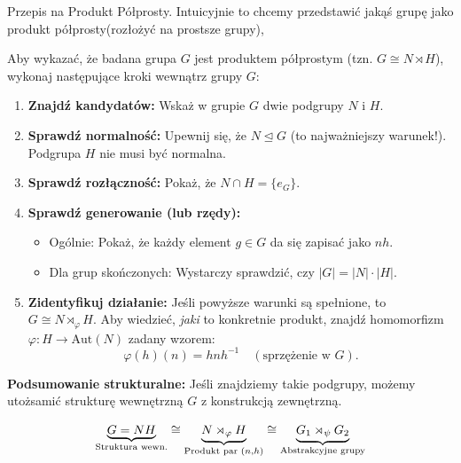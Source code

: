 \begin{context}
	Przepis na Produkt Półprosty. Intuicyjnie to chcemy przedstawić jakąś grupę jako produkt półprosty(rozłożyć na prostsze grupy),
\end{context}
\begin{remark}
Aby wykazać, że badana grupa $G$ jest produktem półprostym (tzn. $G \cong N \rtimes H$), wykonaj następujące kroki wewnątrz grupy $G$:

\begin{enumerate}[label=\textbf{Krok \arabic*.}, leftmargin=*, labelsep=1em]
    \item \textbf{Znajdź kandydatów:} Wskaż w grupie $G$ dwie podgrupy $N$ i $H$.
    \item \textbf{Sprawdź normalność:} Upewnij się, że $N \unlhd G$ (to najważniejszy warunek!). Podgrupa $H$ nie musi być normalna.
    \item \textbf{Sprawdź rozłączność:} Pokaż, że $N \cap H = \{e_G\}$.
    \item \textbf{Sprawdź generowanie (lub rzędy):}
    \begin{itemize}
        \item Ogólnie: Pokaż, że każdy element $g \in G$ da się zapisać jako $nh$.
        \item Dla grup skończonych: Wystarczy sprawdzić, czy $|G| = |N| \cdot |H|$.
    \end{itemize}
    \item \textbf{Zidentyfikuj działanie:} Jeśli powyższe warunki są spełnione, to $G \cong N \rtimes_\varphi H$. Aby wiedzieć, \textit{jaki} to konkretnie produkt, znajdź homomorfizm $\varphi: H \to \text{Aut}(N)$ zadany wzorem:
    \[ \varphi(h)(n) = hnh^{-1} \quad (\text{sprzężenie w } G). \]
\end{enumerate}

\vspace{1em}
\noindent\textbf{Podsumowanie strukturalne:}
Jeśli znajdziemy takie podgrupy, możemy utożsamić strukturę wewnętrzną $G$ z konstrukcją zewnętrzną.

\begin{figure}[H]
    \centering
    \begin{equation*}
        \underbrace{G = NH}_{\text{Struktura wewn.}} \cong \underbrace{N \tikzmark{CG}\rtimes_{\varphi}H}_{\text{Produkt par } (n,h)} \cong \underbrace{G_1 \tikzmark{IG}\rtimes_{\psi} G_2}_{\text{Abstrakcyjne grupy}} 
    \end{equation*}
\end{figure}
\end{remark}
